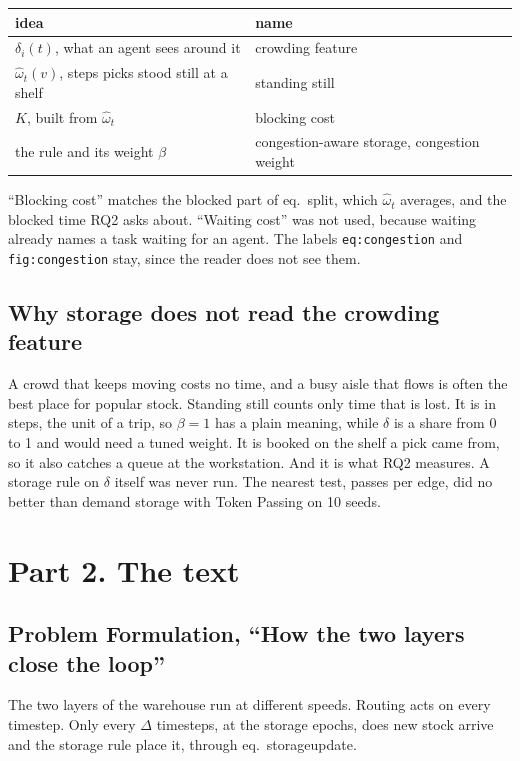 \documentclass[11pt,a4paper]{article}
\begin{document}
\begin{center}
\begin{tabular}{ll}
\toprule
idea & name \\
\midrule
$\delta_i(t)$, what an agent sees around it & crowding feature \\
$\hat\omega_t(v)$, steps picks stood still at a shelf & standing still \\
$K$, built from $\hat\omega_t$ & blocking cost \\
the rule and its weight $\beta$ & congestion-aware storage, congestion weight \\
\bottomrule
\end{tabular}
\end{center}
``Blocking cost'' matches the blocked part of eq.~split, which $\hat\omega_t$
averages, and the blocked time RQ2 asks about. ``Waiting cost'' was not used,
because waiting already names a task waiting for an agent. The labels
\texttt{eq:congestion} and \texttt{fig:congestion} stay, since the reader does
not see them.

\subsection*{Why storage does not read the crowding feature}
A crowd that keeps moving costs no time, and a busy aisle that flows is often the
best place for popular stock. Standing still counts only time that is lost. It
is in steps, the unit of a trip, so $\beta = 1$ has a plain meaning, while
$\delta$ is a share from 0 to 1 and would need a tuned weight. It is booked on
the shelf a pick came from, so it also catches a queue at the workstation. And it
is what RQ2 measures. A storage rule on $\delta$ itself was never run. The
nearest test, passes per edge, did no better than demand storage with Token
Passing on 10 seeds.

\section*{Part 2. The text}

\subsection*{Problem Formulation, ``How the two layers close the loop''}

The two layers of the warehouse run at different speeds. Routing acts on
every timestep. Only every $\Delta$ timesteps, at the storage epochs, does
new stock arrive and the storage rule place it, through eq.~storageupdate.
\end{document}
